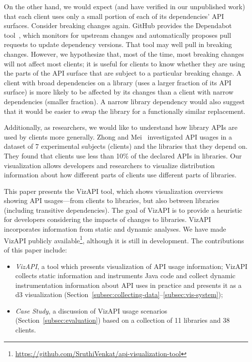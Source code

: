 On the other hand, we would expect (and have verified in our unpublished work) that each client uses only a small portion of each of its dependencies' API surfaces. Consider breaking changes again. GitHub provides the Dependabot tool~\cite{mullans20:_keep_depen}, which monitors for upstream changes and automatically proposes pull requests to update dependency versions. That tool may well pull in breaking changes. However, we hypothesize that, most of the time, most breaking changes will not affect most clients; it is useful for clients to know whether they are using the parts of the API surface that are subject to a particular breaking change. A client with broad dependencies on a library (uses a larger fraction of its API surface) is more likely to be affected by its changes than a client with narrow dependencies (smaller fraction). A narrow library dependency would also suggest that it would be easier to swap the library for a functionally similar replacement.

Additionally, as researchers, we would like to understand how library
APIs are used by clients more generally. Zhong and
Mei~\cite{zhong19:_empir_study_api_usages} investigated API usages in
a dataset of 7 experimental subjects (clients) and the libraries that
they depend on.  They found that clients use less than 10\% of the
declared APIs in libraries. Our visualization allows developers and
researchers to visualize distribution information about how different
parts of clients use different parts of libraries.

This paper presents the VizAPI tool, which shows visualization overviews showing API usages---from clients to libraries, but also between libraries (including transitive dependencies). The goal of VizAPI is to provide a heuristic for developers considering the impacts of changes to libraries. VizAPI incorporates information from static and dynamic analyses.  We have made VizAPI publicly available\footnote{\url{https://github.com/SruthiVenkat/api-visualization-tool}}, although it is still in development. The contributions of this paper include:


\begin{itemize}

\item \emph{VizAPI}, a tool which presents visualization of API usage information; VizAPI collects static information and instruments Java code and collect dynamic instrumentation information about API uses in practice and presents it as a d3 visualization (Section~\ref{subsec:collecting-data}--\ref{subsec:vis-system});
\item \emph{Case Study}, a discussion of VizAPI usage scenarios (Section~\ref{subsec:evaluation}) based on a collection of 11 libraries and 38 clients.
\end{itemize}


